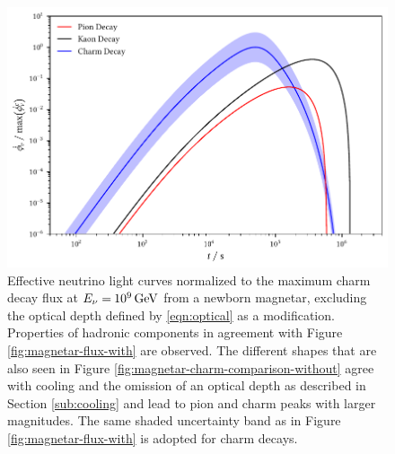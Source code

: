 \begin{figure}[H]
	\centering
	\includegraphics{../plots/build/magnetar_neutrino_spectrum_without.pdf}
	\caption[Magnetar $\nu \kern+0.5pt$ flux compared to $c$ decay without optical depth.]
			{Effective neutrino light curves normalized to the maximum charm decay flux at
			 $E_\nu = \kern-0.5pt \qty{e9}{\giga\electronvolt}$ from a newborn magnetar, excluding the optical depth
			 defined by \eqref{eqn:optical} as a modification. Properties of hadronic components in agreement with
			 Figure \ref{fig:magnetar-flux-with} are observed. The different shapes that are also seen in Figure
			 \ref{fig:magnetar-charm-comparison-without} agree with cooling and the omission of an optical depth 
			 as described in Section \ref{sub:cooling} and lead to pion and charm peaks with larger magnitudes.
			 The same shaded uncertainty band as in Figure \ref{fig:magnetar-flux-with} is adopted for charm decays.}
	\label{fig:magnetar-flux-without}
\end{figure}
